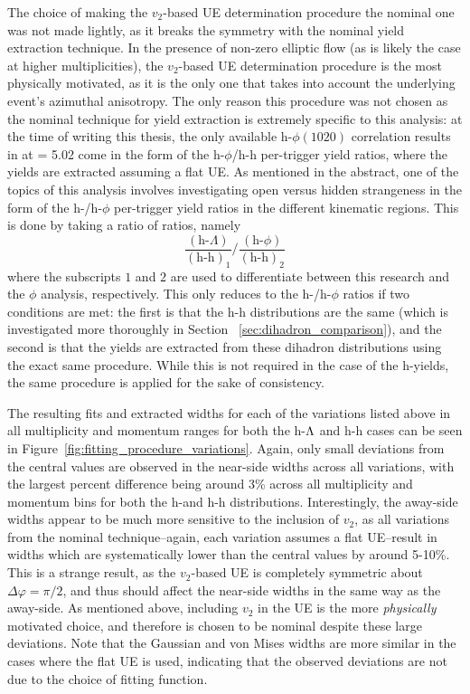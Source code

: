 The choice of making the $v_{2}$-based UE determination procedure the nominal one was not made lightly, as it breaks the symmetry with the nominal yield extraction technique. In the presence of non-zero elliptic flow (as is likely the case at higher multiplicities), the $v_{2}$-based UE determination procedure is the most physically motivated, as it is the only one that takes into account the underlying event's azimuthal anisotropy. The only reason this procedure was not chosen as the nominal technique for yield extraction is extremely specific to this analysis: at the time of writing this thesis, the only available h-$\phi(1020)$ correlation results in \pPb at \snn = 5.02 \TeV come in the form of the h-$\phi$/h-h per-trigger yield ratios, where the yields are extracted assuming a flat UE. As mentioned in the abstract, one of the topics of this analysis involves investigating open versus hidden strangeness in the form of the h-\lmb/h-$\phi$ per-trigger yield ratios in the different kinematic regions. This is done by taking a ratio of ratios, namely
%
\begin{equation}
    \label{eq:ratio_of_ratios}
    \frac{(\text{h-}\Lambda)}{(\text{h-h})_{1}}/\frac{(\text{h-}\phi)}{(\text{h-h})_{2}}
\end{equation}
%
where the subscripts $1$ and $2$ are used to differentiate between this research and the $\phi$ analysis, respectively. This only reduces to the h-\lmb/h-$\phi$ ratios if two conditions are met: the first is that the h-h distributions are the same (which is investigated more thoroughly in Section ~\ref{sec:dihadron_comparison}), and the second is that the yields are extracted from these dihadron distributions using the exact same procedure. While this is not required in the case of the h-\lmb yields, the same procedure is applied for the sake of consistency. 


The resulting fits and extracted widths for each of the variations listed above in all multiplicity and momentum ranges for both the h-$\Lambda$ and h-h cases can be seen in Figure~\ref{fig:fitting_procedure_variations}. Again, only small deviations from the central values are observed in the near-side widths across all variations, with the largest percent difference being around 3\% across all multiplicity and momentum bins for both the h-\lmb and h-h distributions. Interestingly, the away-side widths appear to be much more sensitive to the inclusion of $v_{2}$, as all variations from the nominal technique--again, each variation assumes a flat UE--result in widths which are systematically lower than the central values by around 5-10\%. This is a strange result, as the $v_{2}$-based UE is completely symmetric about $\Delta\varphi = \pi/2$, and thus should affect the near-side widths in the same way as the away-side. As mentioned above, including $v_{2}$ in the UE is the more \textit{physically} motivated choice, and therefore is chosen to be nominal despite these large deviations. Note that the Gaussian and von Mises widths are more similar in the cases where the flat UE is used, indicating that the observed deviations are not due to the choice of fitting function.

